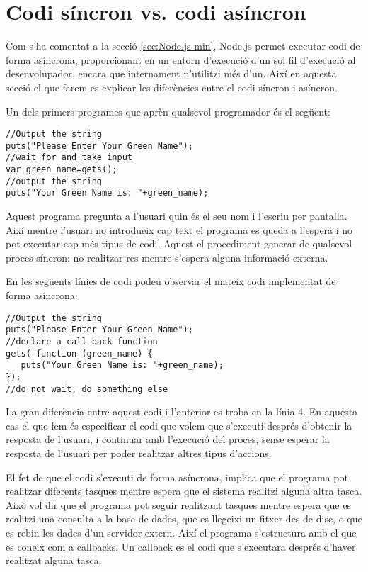\section{Codi síncron vs. codi asíncron}
\label{sec:sincron-ascinron}

Com s'ha comentat a la secció \ref{sec:Node.js-min}, Node.js permet executar codi de forma asíncrona, proporcionant en un entorn d'execució d'un sol fil d'execució al desenvolupador, encara que internament n'utilitzi més d'un. Així en aquesta secció el que farem es explicar les diferències entre el codi síncron i asíncron.

Un dels primers programes que aprèn qualsevol programador és el següent:

\begin{lstlisting}
//Output the string
puts("Please Enter Your Green Name");
//wait for and take input
var green_name=gets();
//output the string
puts("Your Green Name is: "+green_name);
\end{lstlisting}

Aquest programa pregunta a l'usuari quin és el seu nom i l'escriu per pantalla. Així mentre l'usuari no introdueix cap text el programa es queda a l'espera i no pot executar cap més tipus de codi. Aquest el procediment generar de qualsevol proces síncron: no realitzar res mentre s'espera alguna informació externa.

En les següents línies de codi podeu observar el mateix codi implementat de forma asíncrona:
	
\begin{lstlisting}
//Output the string
puts("Please Enter Your Green Name");
//declare a call back function
gets( function (green_name) {
   puts("Your Green Name is: "+green_name);
});
//do not wait, do something else
\end{lstlisting}

La gran diferència entre aquest codi i l'anterior es troba en la línia 4. En aquesta cas el que fem és especificar el codi que volem que s'executi després d'obtenir la resposta de l'usuari, i continuar amb l'execució del proces, sense esperar la resposta de l'usuari per poder realitzar altres tipus d'accions. 

El fet de que el codi s'executi de forma asíncrona, implica que el programa pot realitzar diferents tasques mentre espera que el sistema realitzi alguna altra tasca. Això vol dir que el programa pot seguir realitzant tasques mentre espera que es realitzi una consulta a la base de dades, que es llegeixi un fitxer des de disc, o que es rebin les dades d'un servidor extern. Així el programa s'estructura amb el que es coneix com a callbacks. Un callback es el codi que s'executara després d'haver realitzat alguna tasca. 

